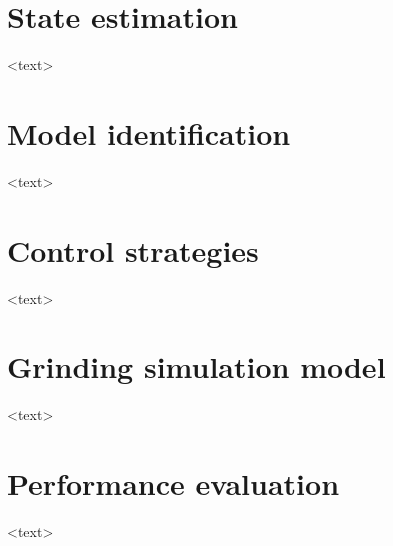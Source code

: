 \section{State estimation}

<text>


\section{Model identification}


<text>


\section{Control strategies}

<text>


\section{Grinding simulation model}

<text>


\section{Performance evaluation}
	
<text>

